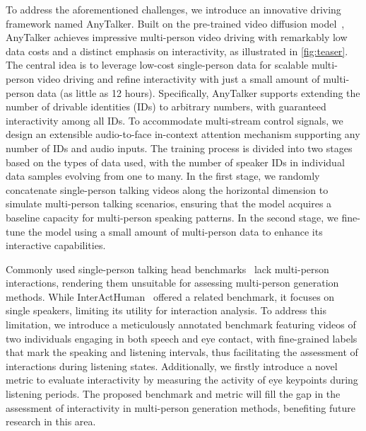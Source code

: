 To address the aforementioned challenges, we introduce an innovative driving framework named AnyTalker. 
Built on the pre-trained video diffusion model~\cite{wan2025wan}, AnyTalker achieves impressive multi-person video driving with remarkably low data costs and a distinct emphasis on interactivity, as illustrated in \cref{fig:teaser}.
The central idea is to leverage low-cost single-person data for scalable multi-person video driving and refine interactivity with just a small amount of multi-person data (as little as 12 hours). 
Specifically, AnyTalker supports extending the number of drivable identities (IDs) to arbitrary numbers, with guaranteed interactivity among all IDs. 
To accommodate multi-stream control signals, we design an extensible audio-to-face in-context attention mechanism supporting any number of IDs and audio inputs.
The training process is divided into two stages based on the types of data used, with the number of speaker IDs in individual data samples evolving from one to many.
In the first stage, we randomly concatenate single-person talking videos along the horizontal dimension to simulate multi-person talking scenarios, ensuring that the model acquires a baseline capacity for multi-person speaking patterns. 
In the second stage, we fine-tune the model using a small amount of multi-person data to enhance its interactive capabilities.

Commonly used single-person talking head benchmarks~\cite{zhang2021flow, xie2022vfhq, zhu2022celebv} lack multi-person interactions, rendering them unsuitable for assessing multi-person generation methods.
While InterActHuman~\cite{wang2025interacthuman} offered a related benchmark, it focuses on single speakers, limiting its utility for interaction analysis. 
To address this limitation, we introduce a meticulously annotated benchmark featuring videos of two individuals engaging in both speech and eye contact, with fine-grained labels that mark the speaking and listening intervals, thus facilitating the assessment of interactions during listening states.
Additionally, we firstly introduce a novel metric to evaluate interactivity by measuring the activity of eye keypoints during listening periods. 
The proposed benchmark and metric will fill the gap in the assessment of interactivity in multi-person generation methods, benefiting future research in this area.

